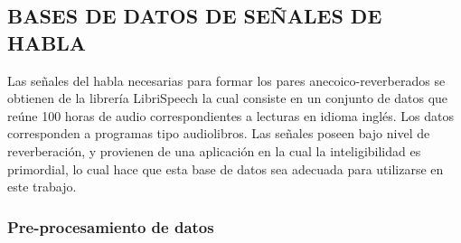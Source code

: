 \subsection[Bases de datos de señales de habla]{BASES DE DATOS DE SEÑALES DE HABLA}

Las señales del habla necesarias para formar los pares anecoico-reverberados se obtienen de la librería LibriSpeech \cite{librispeech} la cual consiste en un conjunto de datos que reúne 100 horas de audio correspondientes a lecturas en idioma inglés. Los datos corresponden a programas tipo audiolibros. Las señales poseen bajo nivel de reverberación, y provienen de una aplicación en la cual la inteligibilidad es primordial, lo cual hace que esta base de datos sea adecuada para utilizarse en este trabajo.

\subsubsection{Pre-procesamiento de datos}


